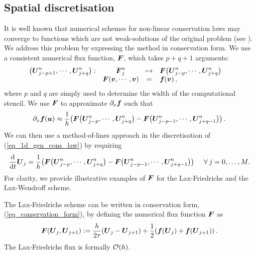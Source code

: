 \documentclass[final]{amsart}
\renewcommand{\dfunkmapstonumflux}[5]{\ensuremath{
		\begin{array}{rccl}
			{#1}: & {#2} &\mapsto&{#3}
			\\
			& {#4} &=&{#5}
		\end{array}\quad}}
\renewcommand{\vect}[1]{\geovec{#1}}
\renewcommand{\vec}[1]{\geovec{#1}}
\numberwithin{equation}{section}
\begin{document}
\subsection{Spatial discretisation}
It is well known that numerical schemes for
non-linear conservation laws may converge to functions which are not weak-solutions of the original problem (see \cite[\S12.1]{leveque1992numerical}). We address this problem by expressing the method in conservation form. We use a consistent numerical flux
function, $\vec{F}$, which takes $p+q+1$ arguments:
\begin{equation}\label{eq_defn_num_flux}
\dfunkmapstonumflux{\qp{\vec{U}^n_{j-p+1},\cdots,\vec{U}^n_{j+q}}}{\vec{F}^n_j}{{\vec{F}}\qp{\vec{U}^n_{j-p},\cdots,\vec{U}^n_{j+q}}}{\vec{F}\qp{\vec{v},\cdots,\vec{v}}}{\vec{f}\qp{\vec{v}}, }
\end{equation}
where $p$ and $q$ are simply used to determine the width of the
computational stencil.  We use $\vec{F}$ to approximate
$\partial_{x}\vec{f}$ such that
\begin{equation}\label{eq_num_approx_f}
  \partial_{x}\vec{f}\qp{\vec{u}}\approx \frac{1}{h}\qp{{\vec{F}\qp{\vec{U}^n_{j-p},\cdots,\vec{U}^n_{j+q}}}-{\vec{F}\qp{\vec{U}^n_{j-p-1},\cdots,\vec{U}^n_{j+q-1}}}}.
\end{equation}
We can then use a method-of-lines approach in the discretisation of
(\ref{eq_1d_gen_cons_law}) by requiring
\begin{equation}\label{eq_conservation_form}
\frac{\mathrm{d}}{\mathrm{d}t}\vec{U}_j =  \frac{1}{h}\qp{{\vec{F}\qp{\vec{U}^n_{j-p},\cdots,\vec{U}^n_{j+q}}}-{\vec{F}\qp{\vec{U}^n_{j-p-1},\cdots,\vec{U}^n_{j+q-1}}}} \Foreach j=0, \dots, M.
\end{equation}
For clarity, we provide illustrative examples of $\vec{F}$ for the
Lax-Friedrichs and the Lax-Wendroff scheme. 

\begin{Rem}
  The Lax-Friedrichs scheme can be written in conservation form,
  (\ref{eq_conservation_form}), by defining the numerical flux
  function $\vec{F}$ as
  \begin{equation}\label{eq_F_LxF_cons}
     \vect F\qp{ \vect U_j,  \vect U_{j+1}}
    :=
    \frac{h}{2\tau}\qp{ \vec U_j- \vec U_{j+1}}
    +
    \frac{1}{2}\qp{ \vec f\qp{ \vec U_j}+ \vec f\qp{\vect U_{j+1}}}.
  \end{equation}
  The Lax-Friedrichs flux is formally $\mathcal{O}\!\left({h}\right)$.
\end{Rem}
\end{document}
